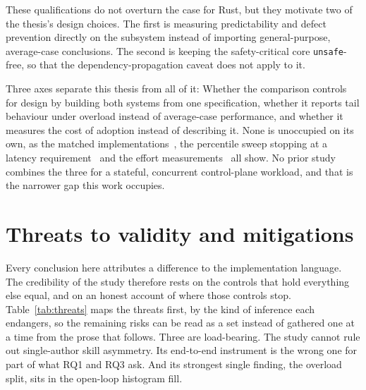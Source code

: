 \documentclass[english,oneside,a4paper,censored,csm,software-track-2020]{HYthesisML}
\begin{document}
These qualifications do not overturn the case for Rust, but they motivate two of the thesis's
design choices. The first is measuring predictability and defect prevention directly on the
subsystem instead of importing general-purpose, average-case conclusions. The second is keeping
the safety-critical core \texttt{unsafe}-free, so that the dependency-propagation caveat does not
apply to it.

Three axes separate this thesis from all of it: Whether the comparison controls for design by
building both systems from one specification, whether it reports tail behaviour under overload
instead of average-case performance, and whether it measures the cost of adoption instead of
describing it. None is unoccupied on its own, as the matched
implementations~\cite{emmerich2019drivers,li2021ipc,narayanan2020redleaf,suchert2023stamp,gonzalez2023rustudp,pirelli2023safelowlevel,emberg2023asn1},
the percentile sweep stopping at a latency requirement~\cite{arvidsson2025async} and the effort
measurements~\cite{karlback2021ran,fulton2021adopting} all show. No prior study combines the
three for a stateful, concurrent control-plane workload, and that is the narrower gap this work
occupies.

\section{Threats to validity and mitigations}\label{sec:threats}
Every conclusion here attributes a difference to the implementation language. The
credibility of the study therefore rests on the controls that hold everything else equal, and on an
honest account of where those controls stop. Table~\ref{tab:threats} maps the threats first, by the
kind of inference each endangers, so the remaining risks can be read as a set instead of
gathered one at a time from the prose that follows. Three are load-bearing. The study cannot rule
out single-author skill asymmetry. Its end-to-end instrument is the wrong one for part of what RQ1
and RQ3 ask. And its strongest single finding, the overload split, sits in the open-loop histogram fill.
\end{document}
